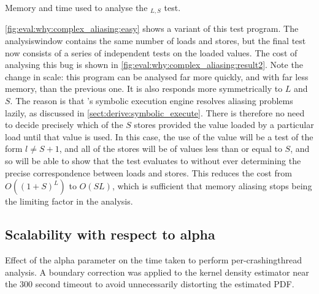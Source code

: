 \begin{sanefig}
  \caption{Memory and time used to analyse the
    $_{L,S}$ test.}
  \label{fig:eval:why:complex_aliasing:result2}
\end{sanefig}

\autoref{fig:eval:why:complex_aliasing:easy} shows a variant of this
test program.  The \gls{analysiswindow} contains the same number of
loads and stores, but the final test now consists of a series of
independent tests on the loaded values.  The cost of analysing this
bug is shown in \autoref{fig:eval:why:complex_aliasing:result2}.  Note
the change in scale: this program can be analysed far more quickly,
and with far less memory, than the previous one.  It is also responds
more symmetrically to $L$ and $S$.  The reason is that {\technique}'s
symbolic execution engine resolves aliasing problems lazily, as
discussed in \autoref{sect:derive:symbolic_execute}.  There is
therefore no need to decide precisely which of the $S$ stores provided
the value loaded by a particular load until that value is
used.  In this case, the use of the value will be a
test of the form $l \not= S+1$, and all of the stores will be of
values less than or equal to $S$, and so {\technique} will be able to
show that the test evaluates to {\true} without ever determining the
precise correspondence between loads and stores.  This reduces the
cost from $O((1+S)^L)$ to $O(SL)$, which is sufficient that memory
aliasing stops being the limiting factor in the analysis.


\subsection{Scalability with respect to \gls{alpha}}


\begin{sanefig}
  \caption{Effect of the \gls{alpha} parameter on the time taken to
    perform per-\gls{crashingthread} analysis.  A boundary correction
    was applied to the kernel density estimator near the 300 second
    timeout to avoid unnecessarily distorting the estimated PDF.}
  \label{fig:perf:alpha:bpm:unopt}
\end{sanefig}

